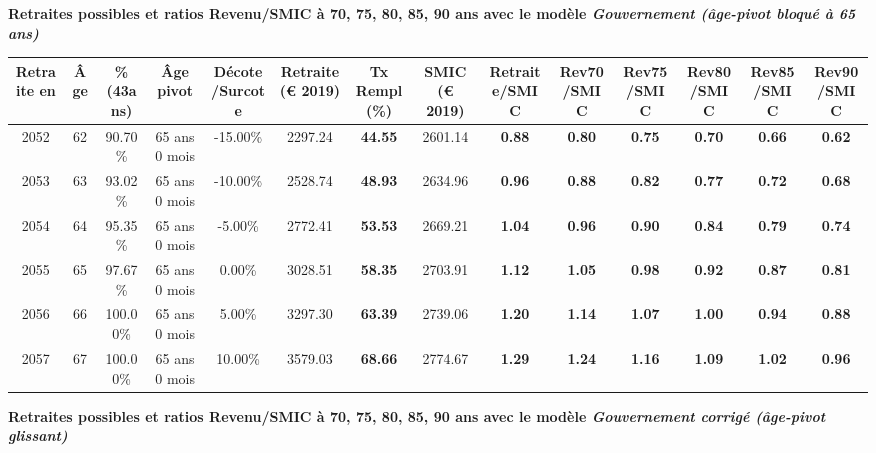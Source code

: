 {\bf \noindent Retraites possibles et ratios Revenu/SMIC à 70, 75, 80, 85, 90 ans avec le modèle \emph{Gouvernement (âge-pivot bloqué à 65 ans)}}  
 
\begin{adjustbox}{max width=\textwidth} 
\begin{tabular}[htb]{|c|c||c|c|c||c|c||c||c|c|c|c|c|c|} 
\hline 
 Retraite en &  Âge &  \%(43ans) &  Âge pivot &  Décote/Surcote &  Retraite (\euro{} 2019) &  Tx Rempl(\%) &  SMIC (\euro{} 2019) &  Retraite/SMIC &  Rev70/SMIC &  Rev75/SMIC &  Rev80/SMIC &  Rev85/SMIC &  Rev90/SMIC \\ 
\hline \hline 
 2052 &  62 &  90.70\% &  65 ans 0 mois &  -15.00\% &  2297.24 &  {\bf 44.55} &  2601.14 &  {\bf {\color{red} 0.88}} &  {\bf {\color{red} 0.80}} &  {\bf {\color{red} 0.75}} &  {\bf {\color{red} 0.70}} &  {\bf {\color{red} 0.66}} &  {\bf {\color{red} 0.62}} \\ 
\hline 
 2053 &  63 &  93.02\% &  65 ans 0 mois &  -10.00\% &  2528.74 &  {\bf 48.93} &  2634.96 &  {\bf {\color{red} 0.96}} &  {\bf {\color{red} 0.88}} &  {\bf {\color{red} 0.82}} &  {\bf {\color{red} 0.77}} &  {\bf {\color{red} 0.72}} &  {\bf {\color{red} 0.68}} \\ 
\hline 
 2054 &  64 &  95.35\% &  65 ans 0 mois &  -5.00\% &  2772.41 &  {\bf 53.53} &  2669.21 &  {\bf 1.04} &  {\bf {\color{red} 0.96}} &  {\bf {\color{red} 0.90}} &  {\bf {\color{red} 0.84}} &  {\bf {\color{red} 0.79}} &  {\bf {\color{red} 0.74}} \\ 
\hline 
 2055 &  65 &  97.67\% &  65 ans 0 mois &  0.00\% &  3028.51 &  {\bf 58.35} &  2703.91 &  {\bf 1.12} &  {\bf 1.05} &  {\bf {\color{red} 0.98}} &  {\bf {\color{red} 0.92}} &  {\bf {\color{red} 0.87}} &  {\bf {\color{red} 0.81}} \\ 
\hline 
 2056 &  66 &  100.00\% &  65 ans 0 mois &  5.00\% &  3297.30 &  {\bf 63.39} &  2739.06 &  {\bf 1.20} &  {\bf 1.14} &  {\bf 1.07} &  {\bf 1.00} &  {\bf {\color{red} 0.94}} &  {\bf {\color{red} 0.88}} \\ 
\hline 
 2057 &  67 &  100.00\% &  65 ans 0 mois &  10.00\% &  3579.03 &  {\bf 68.66} &  2774.67 &  {\bf 1.29} &  {\bf 1.24} &  {\bf 1.16} &  {\bf 1.09} &  {\bf 1.02} &  {\bf {\color{red} 0.96}} \\ 
\hline 
\hline 
\end{tabular} 
\end{adjustbox} 
 
 \vspace{0.1cm} 
{\bf \noindent Retraites possibles et ratios Revenu/SMIC à 70, 75, 80, 85, 90 ans avec le modèle \emph{Gouvernement corrigé (âge-pivot glissant)}}  
 
